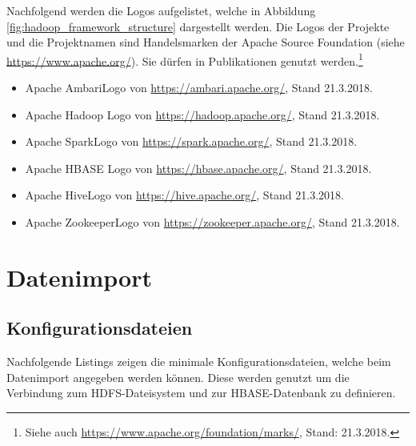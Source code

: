 \noindent
Nachfolgend werden die Logos aufgelistet, welche in Abbildung \ref{fig:hadoop_framework_structure} dargestellt werden. Die Logos der Projekte und die Projektnamen sind Handelsmarken der Apache Source Foundation (siehe \url{https://www.apache.org/}). Sie dürfen in Publikationen genutzt werden.\footnote{Siehe auch \url{https://www.apache.org/foundation/marks/}, Stand: 21.3.2018.}

\begin{itemize}
\item Apache Ambari\texttrademark\thinspace Logo von \url{https://ambari.apache.org/}, Stand 21.3.2018. 
\item Apache Hadoop\textsuperscript{\textregistered} Logo von \url{https://hadoop.apache.org/}, Stand 21.3.2018.
\item Apache Spark\texttrademark\thinspace Logo von \url{https://spark.apache.org/}, Stand 21.3.2018.
\item Apache HBASE\textsuperscript{\textregistered} Logo von \url{https://hbase.apache.org/}, Stand 21.3.2018.
\item Apache Hive\texttrademark\thinspace Logo von \url{https://hive.apache.org/}, Stand 21.3.2018.
\item Apache Zookeeper\texttrademark\thinspace Logo von \url{https://zookeeper.apache.org/}, Stand 21.3.2018.
\end{itemize}


\chapter{Datenimport}
\section{Konfigurationsdateien}
\label{sec:appendix_data_import_config_management}
Nachfolgende Listings zeigen die minimale Konfigurationsdateien, welche beim Datenimport angegeben werden können. Diese werden genutzt um die Verbindung zum HDFS-Dateisystem und zur HBASE-Datenbank zu definieren.





%